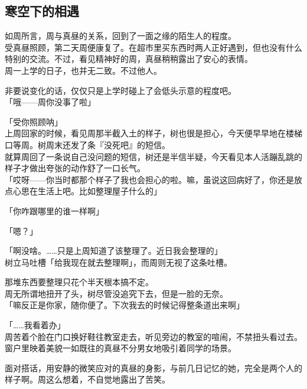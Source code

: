 \subsection{寒空下的相遇}

如周所言，周与真昼的关系，回到了一面之缘的陌生人的程度。\\

受真昼照顾，第二天周便康复了。在超市里买东西时两人正好遇到，但也没有什么特别的交流。不过，看见精神好的周，真昼稍稍露出了安心的表情。\\

周一上学的日子，也并无二致。不过他人。

非要说变化的话，仅仅只是上学时碰上了会低头示意的程度吧。\\

「哦——周你没事了啦」

「受你照顾呐」\\

上周回家的时候，看见周那半截入土的样子，树也很是担心，今天便早早地在楼梯口等周。树周末还发了条『没死吧』的短信。\\

就算周回了一条说自己没问题的短信，树还是半信半疑，今天看见本人活蹦乱跳的样子才做出夸张的动作舒了一口长气。\\

「哎呀——你当时都那个样子了我也会担心的啦。嘛，虽说这回病好了，你还是放点心思在生活上吧。比如整理屋子什么的」

「你咋跟哪里的谁一样啊」

「嗯？」

「啊没啥。……只是上周知道了该整理了。近日我会整理的」\\

树立马吐槽「给我现在就去整理啊」，而周则无视了这条吐槽。

那堆东西要整理只花个半天根本搞不定。\\

周无所谓地扭开了头，树尽管没追究下去，但是一脸的无奈。\\

「嘛反正是你家，随你便了。下次我去的时候记得整条道出来啊」

「……我看着办」\\

周苦着个脸在门口换好鞋往教室走去，听见旁边的教室的喧闹，不禁扭头看过去。\\

窗户里映着美貌一如既往的真昼不分男女地吸引着同学的场景。

面对搭话，用安静的微笑应对的真昼的身影，与前几日记忆的她，完全是两个人的样子啊。周这么想着，不自觉地露出了苦笑。\\

